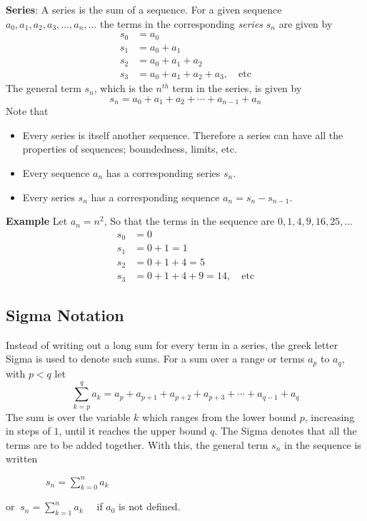 \documentclass[]{report}
\begin{document}
\noindent \textbf{Series}: A series is the sum of a sequence. For a given sequence $a_0,a_1,a_2,a_3,\ldots,a_n,\ldots$ the terms in the corresponding \emph{series} $s_n$ are given by
\begin{align*}
  s_0&=a_0\\
  s_1&=a_0+a_1\\
  s_2&=a_0+a_1+a_2\\
  s_3&=a_0+a_1+a_2+a_3,\quad \text{etc}
\end{align*}
The general term $s_n$, which is the $n^{th}$ term in the series, is given by
\begin{equation*}
  s_n=a_0+a_1+a_2+\cdots+a_{n-1}+a_n
\end{equation*}
Note that
\begin{itemize}
\item Every series is itself another sequence. Therefore a series can have all the properties of sequences; boundedness, limits, etc.
\item Every sequence $a_n$ has a corresponding series $s_n$.
\item Every series $s_n$ has a corresponding sequence $a_n=s_n-s_{n-1}$.
\end{itemize}
\noindent  \textbf{Example}
Let $a_n=n^2$, So that the terms in the sequence are $0,1,4,9,16,25,\ldots$
\begin{align*}
  s_0&=0\\
  s_1&=0+1=1\\
  s_2&=0+1+4=5\\
  s_3&=0+1+4+9=14,\quad \text{etc}
\end{align*}

\subsection*{Sigma Notation}
Instead of writing out a long sum for every term in a series, the greek letter Sigma is used to denote such sums. For a sum over a range or terms $a_p$ to $a_q$, with $p<q$ let
\begin{equation*}
  \sum_{k=p}^{q}a_k = a_p+a_{p+1}+a_{p+2}+a_{p+3}+\cdots+a_{q-1}+a_q
\end{equation*}
The sum is over the variable $k$ which ranges from the lower bound $p$, increasing in steps of $1$, until it reaches the upper bound $q$. The Sigma denotes that all the terms are to be added together. With this, the general term $s_n$ in the sequence is written
\begin{multicols}{2}
$\qquad \qquad s_n=\displaystyle \sum_{k=0}^n a_k$
\columnbreak

or $\ s_n=\displaystyle \sum_{k=1}^n a_k\quad $ if $a_0$ is not defined.
\end{multicols}
\pagebreak
\end{document}
